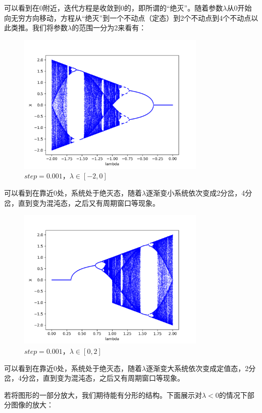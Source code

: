 \documentclass[a4paper,11pt]{article}
\begin{document}
可以看到在0附近，迭代方程是收敛到0的，即所谓的“绝灭”。随着参数$\lambda$从0开始向无穷方向移动，方程从“绝灭”到一个不动点（定态）到2个不动点到4个不动点以此类推。我们将参数$\lambda$的范围一分为2来看有：



\begin{figure}[!htbp]        
\centering
\includegraphics[bb= 0 0 450 370,width=9cm]{s=0.001-2.png}      
\caption{ $step = 0.001$，$\lambda \in [-2,0]$}      
\end{figure}

\newpage 可以看到在靠近0处，系统处于绝灭态，随着$\lambda$逐渐变小系统依次变成2分岔，4分岔，直到变为混沌态，之后又有周期窗口等现象。

\begin{figure}[!htbp]        
\centering
\includegraphics[bb= 0 0 450 370,width=9cm]{s=0.001-3.png}      
\caption{ $step = 0.001$，$\lambda \in [0,2]$}      
\end{figure}

\newpage 可以看到在靠近0处，系统处于绝灭态，随着$\lambda$逐渐变大系统依次变成定值态，2分岔，4分岔，直到变为混沌态，之后又有周期窗口等现象。

若将图形的一部分放大，我们期待能有分形的结构。下面展示对$\lambda < 0$的情况下部分图像的放大：
\end{document}
